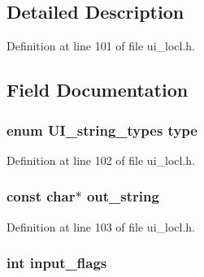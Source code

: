 \subsection{Detailed Description}


Definition at line 101 of file ui\+\_\+locl.\+h.



\subsection{Field Documentation}
\subsubsection[{\texorpdfstring{type}{type}}]{\setlength{\rightskip}{0pt plus 5cm}enum {\bf U\+I\+\_\+string\+\_\+types} type}\hypertarget{structui__string__st_a61fc5b9fd86045d42b1384fb772f83ed}{}\label{structui__string__st_a61fc5b9fd86045d42b1384fb772f83ed}


Definition at line 102 of file ui\+\_\+locl.\+h.

\subsubsection[{\texorpdfstring{out\+\_\+string}{out_string}}]{\setlength{\rightskip}{0pt plus 5cm}const char$\ast$ out\+\_\+string}\hypertarget{structui__string__st_a630b57a841a183dfee377448f5d9731e}{}\label{structui__string__st_a630b57a841a183dfee377448f5d9731e}


Definition at line 103 of file ui\+\_\+locl.\+h.

\subsubsection[{\texorpdfstring{input\+\_\+flags}{input_flags}}]{\setlength{\rightskip}{0pt plus 5cm}int input\+\_\+flags}\hypertarget{structui__string__st_ad86aeaf7d72246d3bb4676899b6ac429}{}\label{structui__string__st_ad86aeaf7d72246d3bb4676899b6ac429}


